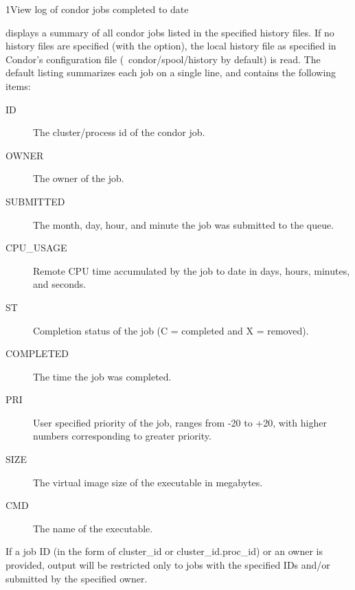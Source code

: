 \begin{ManPage}{}{1}{View log of condor jobs completed to date}
\label{man-condor-history}
\Synopsis {}
  

\Description
{} displays a summary of all condor jobs listed in the
specified history files.  If no history files are specified (with the  option), the local
history file as specified in Condor's configuration file
(~condor/spool/history by default) is read.  The default listing
summarizes each job on a single line, and  contains the following items:

\begin{description}
\item[ID] The cluster/process id of the condor job. 
\item[OWNER] The owner of the job. 
\item[SUBMITTED] The month, day, hour, and minute the job was submitted to the queue. 
\item[CPU\_USAGE] Remote CPU time accumulated by the job to date in days, hours, minutes, and seconds.
\item[ST] Completion status of the job (C = completed and X = removed).
\item[COMPLETED] The time the job was completed.
\item[PRI] User specified priority of the job, ranges from -20 to +20, with higher numbers corresponding to greater priority. 
\item[SIZE] The virtual image size of the executable in megabytes. 
\item[CMD] The name of the executable. 
\end{description}

If a job ID (in the form of cluster\_id or cluster\_id.proc\_id) or an owner is provided, 
output will be restricted only to jobs with the specified IDs and/or submitted by the specified owner.

\begin{Options}
\end{Options}

\end{ManPage}
